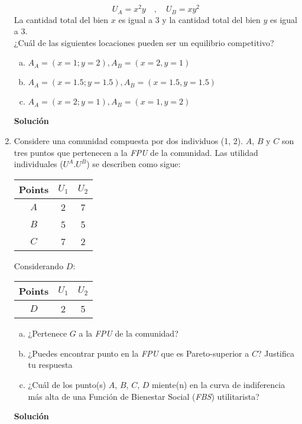 \documentclass[10pt,a4paper]{article}
\begin{document}
\begin{enumerate}
			$$U_A = x^2y \quad , \quad U_B =xy^2$$
	La cantidad total del bien $x$ es igual a 3 y la cantidad total del bien $y$ es igual a 3.\\
	¿Cuál de las siguientes locaciones pueden ser un equilibrio competitivo?
		\begin{enumerate}[a)]
			\item $A_A = (x=1; y=2), A_B = (x=2, y=1)$
			\item $A_A = (x=1.5; y=1.5), A_B = (x=1.5, y=1.5)$
			\item $A_A = (x=2; y=1), A_B = (x=1, y=2)$
		\end{enumerate}
		\textbf{\LARGE Solución}\\
			
	\item Considere una comunidad compuesta por dos individuos (1, 2). $A$, $B$ y $C$ son tres puntos que pertenecen a la \emph{FPU} de la comunidad. Las utilidad individuales ($U^A. U^B$) se describen como sigue:
				\begin{center}
					\begin{tabular}{ccc}
						\hline
							Points & $U_1$ & $U_2$ \\
						\hline
							$A$ & 2 & 7 \\
							$B$ & 5 & 5 \\
							$C$ & 7 & 2 \\
						\hline
					\end{tabular}
				\end{center}
		Considerando $D$:
				\begin{center}
					\begin{tabular}{ccc}
						\hline
							Points & $U_1$ & $U_2$ \\
						\hline
							$D$ & 2 & 5 \\
						\hline
					\end{tabular}
				\end{center}
		\begin{enumerate}[a)]
			\item ¿Pertenece $G$ a la \emph{FPU} de la comunidad?
			\item ¿Puedes encontrar punto en la \emph{FPU} que es Pareto-superior a $C$? Justifica tu respuesta
			\item ¿Cuál de los punto(s) $A$, $B$, $C$, $D$ miente(n) en la curva de indiferencia más alta de una Función de Bienestar Social (\emph{FBS}) utilitarista?
		\end{enumerate}
			\textbf{\LARGE Solución}\\
				

\end{enumerate}
\end{document}
